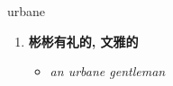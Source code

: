 
\begin{frame}
{\huge urbane}
\begin{center}
\begin{enumerate}\Large
  \item \textbf{彬彬有礼的, 文雅的}
  \begin{itemize}
    \item \em{\Large{an urbane gentleman}}
  \end{itemize}
\end{enumerate}
\end{center}
\end{frame}
